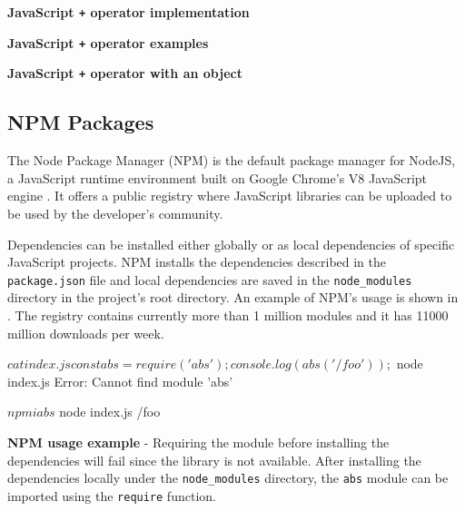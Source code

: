 \begin{code}
	\captionsetup{aboveskip=0pt, belowskip=10pt}
	\caption[JavaScript + operator implementation]{\textbf{JavaScript \texttt{+} operator implementation}}
	\label{code:background-plus-operator-implementation}
\end{code}

\begin{code}
	\captionsetup{aboveskip=0pt, belowskip=10pt}
	\caption[JavaScript + operator examples]{\textbf{JavaScript \texttt{+} operator examples}}
	\label{code:background-plus-operator-simple-examples}
\end{code}

\begin{code}
	\captionsetup{aboveskip=0pt, belowskip=10pt}
	\caption[JavaScript + operator with an object]{\textbf{JavaScript \texttt{+} operator with an object}}
	\label{code:background-plus-operator-object-example}
\end{code}


\subsection{NPM Packages} \label{sec:background-npm-packages}
The Node Package Manager (NPM) is the default package manager for NodeJS, a JavaScript runtime environment built on Google Chrome's V8 JavaScript engine \citep{nodejs}. It offers a public registry where JavaScript libraries can be uploaded to be used by the developer's community.

Dependencies can be installed either globally or as local dependencies of specific JavaScript projects. NPM installs the dependencies described in the \texttt{package.json} file and local dependencies are saved in the \texttt{node_modules} directory in the project's root directory. An example of NPM's usage is shown in . The registry contains currently more than 1 million modules and it has 11000 million downloads per week.

\begin{code}
	\begin{bashinline}
$ cat index.js 
const abs = require('abs');
console.log(abs('/foo'));

$ node index.js
Error: Cannot find module 'abs'

$ npm i abs
$ node index.js
/foo
	  \end{bashinline}
	\caption[NPM usage example]{\textbf{NPM usage example} - Requiring the module before installing the dependencies will fail since the library is not available. After installing the dependencies locally under the \texttt{node_modules} directory, the \texttt{abs} module can be imported using the \texttt{require} function.}
	\label{code:background-npm-usage-example}
  \end{code}

